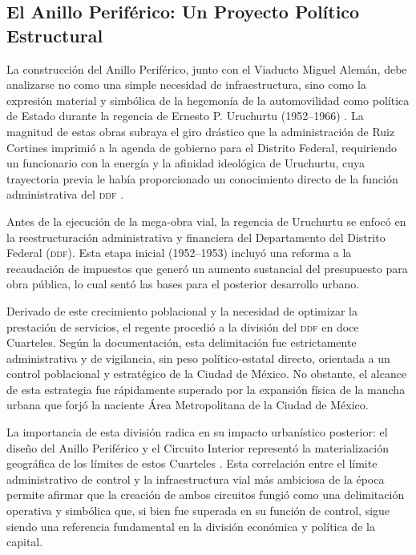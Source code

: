
\subsection{El Anillo Periférico: Un Proyecto Político Estructural}
\label{sec:anillo-periferico}

La construcción del Anillo Periférico, junto con el Viaducto Miguel Alemán, debe
analizarse no como una simple necesidad de infraestructura, sino como la
expresión material y simbólica de la hegemonía de la automovilidad como política
de Estado durante la regencia de Ernesto P. Uruchurtu (1952--1966)
\citep{franco2022}. La magnitud de estas obras subraya el giro drástico que la
administración de Ruiz Cortines imprimió a la agenda de gobierno para el
Distrito Federal, requiriendo un funcionario con la energía y la afinidad
ideológica de Uruchurtu, cuya trayectoria previa le había proporcionado un
conocimiento directo de la función administrativa del \textsc{ddf}
\citep[Tomo~1, p.~173]{perlo2023}.

\label{subsec:xii-cuarteles}

Antes de la ejecución de la mega-obra vial, la regencia de Uruchurtu se enfocó
en la reestructuración administrativa y financiera del Departamento del Distrito
Federal (\textsc{ddf}). Esta etapa inicial (1952--1953) incluyó una reforma a la
recaudación de impuestos que generó un aumento sustancial del presupuesto para
obra pública, lo cual sentó las bases para el posterior desarrollo urbano.

Derivado de este crecimiento poblacional y la necesidad de optimizar la
prestación de servicios, el regente procedió a la división del \textsc{ddf} en
doce Cuarteles. Según la documentación, esta delimitación fue estrictamente
administrativa y de vigilancia, sin peso político-estatal directo, orientada a
un control poblacional y estratégico de la Ciudad de México. No obstante, el
alcance de esta estrategia fue rápidamente superado por la expansión física de
la mancha urbana que forjó la naciente Área Metropolitana de la Ciudad de
México.

La importancia de esta división radica en su impacto urbanístico posterior: el
diseño del Anillo Periférico y el Circuito Interior representó la
materialización geográfica de los límites de estos Cuarteles
\citep[Tomo~1, p.~257]{perlo2023}. Esta correlación entre el límite
administrativo de control y la infraestructura vial más ambiciosa de la época
permite afirmar que la creación de ambos circuitos fungió como una delimitación
operativa y simbólica que, si bien fue superada en su función de control, sigue
siendo una referencia fundamental en la división económica y política de la
capital.

